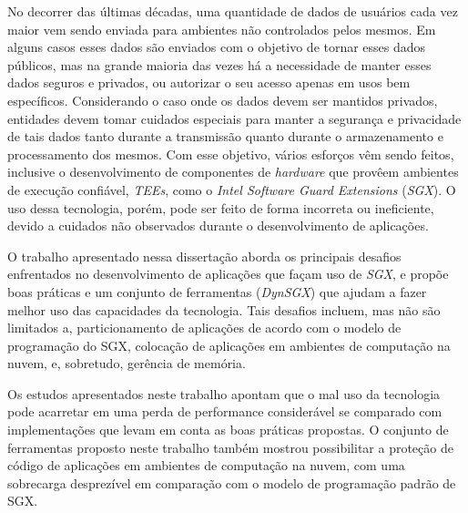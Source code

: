 No decorrer das últimas décadas, uma quantidade de dados de usuários cada vez
maior vem sendo enviada para ambientes não controlados pelos mesmos. Em alguns
casos esses dados são enviados com o objetivo de tornar esses dados públicos,
mas na grande maioria das vezes há a necessidade de manter esses dados seguros e
privados, ou autorizar o seu acesso apenas em usos bem específicos. Considerando
o caso onde os dados devem ser mantidos privados, entidades devem tomar cuidados
especiais para manter a segurança e privacidade de tais dados tanto durante a
transmissão quanto durante o armazenamento e processamento dos mesmos. Com esse
objetivo, vários esforços vêm sendo feitos, inclusive o desenvolvimento de
componentes de \textit{hardware} que provêem ambientes de execução confiável,
\textit{TEEs}, como o \textit{Intel Software Guard Extensions} (\textit{SGX}).
O uso dessa tecnologia, porém, pode ser feito de forma incorreta ou ineficiente,
devido a cuidados não observados durante o desenvolvimento de aplicações.

O trabalho apresentado nessa dissertação aborda os principais desafios
enfrentados no desenvolvimento de aplicações que façam uso de \textit{SGX}, e
propõe boas práticas e um conjunto de ferramentas (\textit{DynSGX}) que ajudam
a fazer melhor uso das capacidades da tecnologia. Tais desafios incluem, mas não
são limitados a, particionamento de aplicações de acordo com o modelo de
programação do SGX, colocação de aplicações em ambientes de computação na nuvem,
e, sobretudo, gerência de memória.

Os estudos apresentados neste trabalho apontam que o mal uso da tecnologia pode
acarretar em uma perda de performance considerável se comparado com
implementações que levam em conta as boas práticas propostas. O conjunto de
ferramentas proposto neste trabalho também mostrou possibilitar a proteção de
código de aplicações em ambientes de computação na nuvem, com uma sobrecarga
desprezível em comparação com o modelo de programação padrão de SGX.